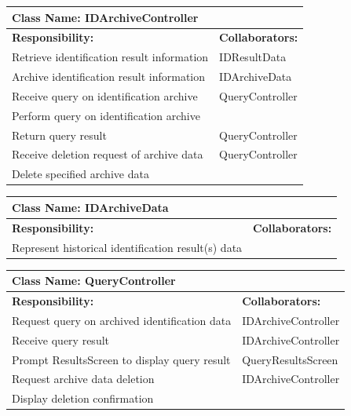 \documentclass[]{article}
\begin{document}
\newpage
	\begin{table}[ht]
		\centering
		\begin{tabular}{|p{5cm}|p{5cm}|}
		\hline 
		 \multicolumn{2}{|l|}{\textbf{Class Name: IDArchiveController}} \\
		\hline
		\textbf{Responsibility:} & \textbf{Collaborators:} \\
		\hline
		Retrieve identification result information & IDResultData \\
		\hline
		Archive identification result information & IDArchiveData \\
		\hline
		Receive query on identification archive & QueryController \\
		\hline
		Perform query on identification archive &  \\
		\hline
		Return query result & QueryController \\
		\hline
		Receive deletion request of archive data & QueryController \\
		\hline
		Delete specified archive data &  \\
		\hline
		\end{tabular}
	\end{table}
	
	\begin{table}[ht]
		\centering
		\begin{tabular}{|p{5cm}|p{5cm}|}
		\hline 
		 \multicolumn{2}{|l|}{\textbf{Class Name: IDArchiveData}} \\
		\hline
		\textbf{Responsibility:} & \textbf{Collaborators:} \\
		\hline
		Represent historical identification result(s) data &  \\
		\hline
		\end{tabular}
	\end{table}
	
	\begin{table}[ht]
		\centering
		\begin{tabular}{|p{5cm}|p{5cm}|}
		\hline 
		 \multicolumn{2}{|l|}{\textbf{Class Name: QueryController}} \\
		\hline
		\textbf{Responsibility:} & \textbf{Collaborators:} \\
		\hline
		Request query on archived identification data & IDArchiveController \\
		\hline
		Receive query result & IDArchiveController \\
		\hline
		Prompt ResultsScreen to display query result & QueryResultsScreen \\
		\hline
		Request archive data deletion & IDArchiveController \\
		\hline
		Display deletion confirmation &  \\
		\hline
		\end{tabular}
	\end{table}
	
\end{document}
